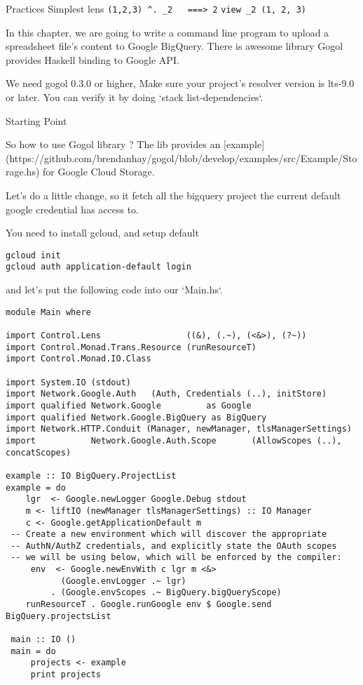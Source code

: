 Practices
Simplest lens
\verb|(1,2,3) ^. _2   ===> 2|
\verb|view _2 (1, 2, 3)|



In this chapter, we are going to write a command line program to upload a spreadsheet file's content to Google BigQuery. There is awesome library Gogol provides Haskell binding to Google API.



We need gogol 0.3.0 or higher, Make sure your project's resolver version is lts-9.0 or later. You can verify it by doing `stack list-dependencies`.

Starting Point

So how to use Gogol library ? The lib provides an [example](https://github.com/brendanhay/gogol/blob/develop/examples/src/Example/Storage.hs) for Google Cloud Storage.

Let's do a little change, so it fetch all the bigquery project the current default google credential has access to.

You need to install gcloud, and setup default
\begin{verbatim}
gcloud init
gcloud auth application-default login
\end{verbatim}

and let's put the following code into our `Main.hs`.

\begin{verbatim}
module Main where

import Control.Lens                 ((&), (.~), (<&>), (?~))
import Control.Monad.Trans.Resource (runResourceT)
import Control.Monad.IO.Class

import System.IO (stdout)
import Network.Google.Auth   (Auth, Credentials (..), initStore)
import qualified Network.Google         as Google
import qualified Network.Google.BigQuery as BigQuery
import Network.HTTP.Conduit (Manager, newManager, tlsManagerSettings)
import           Network.Google.Auth.Scope       (AllowScopes (..),                                                  concatScopes)

example :: IO BigQuery.ProjectList
example = do
    lgr  <- Google.newLogger Google.Debug stdout
    m <- liftIO (newManager tlsManagerSettings) :: IO Manager
    c <- Google.getApplicationDefault m
 -- Create a new environment which will discover the appropriate
 -- AuthN/AuthZ credentials, and explicitly state the OAuth scopes
 -- we will be using below, which will be enforced by the compiler:
     env  <- Google.newEnvWith c lgr m <&>
           (Google.envLogger .~ lgr)
         . (Google.envScopes .~ BigQuery.bigQueryScope)
    runResourceT . Google.runGoogle env $ Google.send BigQuery.projectsList

 main :: IO ()
 main = do
     projects <- example
     print projects
\end{verbatim}

